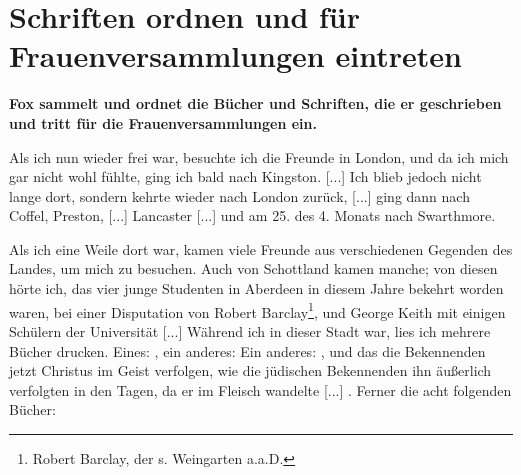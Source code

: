 \chapter[Schriften ordnen und für Frauenversammlungen eintreten]{Schriften 
ordnen und für Frauenversammlungen eintreten}

\begin{center}
\textbf{Fox sammelt und ordnet die Bücher und Schriften, die er
geschrieben und tritt für die Frauenversammlungen ein.}
\end{center}


Als ich nun wieder frei war, besuchte ich die Freunde in
London, und da ich mich gar nicht wohl fühlte, ging ich bald
nach Kingston. [...] Ich blieb jedoch nicht lange dort, sondern
kehrte wieder nach London zurück, [...] ging dann nach Coffel,
Preston, [...] Lancaster [...] und am 25. des 4. Monats nach
Swarthmore.

Als ich eine Weile dort war, kamen viele Freunde aus verschiedenen 
Gegenden des Landes, um mich zu besuchen. Auch
von Schottland kamen manche; von diesen hörte ich, das vier
junge Studenten in Aberdeen in diesem Jahre bekehrt worden
waren, bei einer Disputation von Robert Barclay\footnote{Robert 
Barclay, der s. Weingarten 
a.a.D.},  und George
Keith mit einigen Schülern der Universität 
[...] Während ich
in dieser Stadt war, lies ich mehrere Bücher drucken. Eines:
, ein anderes:   Ein anderes:
, und das die Bekennenden jetzt
Christus im Geist verfolgen, wie die jüdischen Bekennenden ihn
äußerlich verfolgten in den Tagen, da er im Fleisch wandelte [...] .
Ferner die acht folgenden Bücher: 

